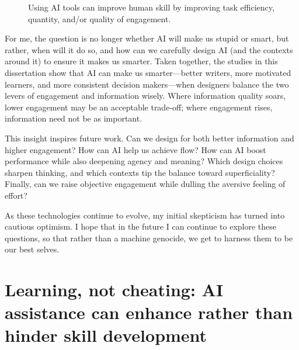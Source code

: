 \documentclass[11pt]{report}
\begin{document}
\begin{mainf}
\begin{figure}[h]
    \caption{Using AI tools can improve human skill by improving task efficiency, quantity, and/or quality of engagement.}
\end{figure}

For me, the question is no longer whether AI will make us stupid or smart, but rather, when will it do so, and how can we carefully design AI (and the contexts around it) to ensure it makes us smarter. 
Taken together, the studies in this dissertation show that AI can make us smarter—better writers, more motivated learners, and more consistent decision makers—when designers balance the two levers of engagement and information wisely. 
Where information quality soars, lower engagement may be an acceptable trade‑off; where engagement rises, information need not be as important. 

This insight inspires future work. 
Can we design for both better information and higher engagement? 
How can AI help us achieve flow? 
How can AI boost performance while also deepening agency and meaning? 
Which design choices sharpen thinking, and which contexts tip the balance toward superficiality? 
Finally, can we raise objective engagement while dulling the aversive feeling of effort? 

As these technologies continue to evolve, my initial skepticism has turned into cautious optimism. 
I hope that in the future I can continue to explore these questions, so that rather than a machine genocide, we get to harness them to be our best selves.



\chapter{Learning, not cheating: AI assistance can enhance rather than hinder skill development}


\end{mainf}
\end{document}
